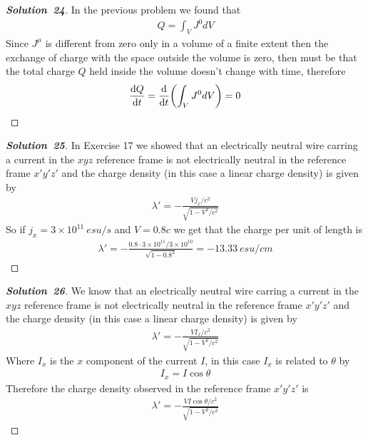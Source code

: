 \documentclass[11pt]{article}
\newcommand{\sci}[1]{\times 10^{#1}}
\theoremstyle{definition}
\renewcommand*{\proofname}{\bf{Solution}}
\begin{document}
\cleardoublepage
\begin{proof}[\proofname\ 24]
In the previous problem we found that
\begin{align*}
    Q = \int_V J^0 dV
\end{align*}
Since $J^\mu$ is different from zero only in a volume of a finite extent then
the exchange of charge with the space outside the volume is zero, then must be
that the total charge $Q$ held inside the volume doesn't change with time, 
therefore
\begin{align*}
    \dv{Q}{t} = \dv{t}(\int_V J^0 dV) = 0
\end{align*}
\end{proof}

\cleardoublepage
\begin{proof}[\proofname\ 25]
In Exercise 17 we showed that an electrically neutral wire carring a current
in the $xyz$ reference frame is not electrically neutral in the reference 
frame $x'y'z'$ and the charge density (in this case a linear charge density)
is given by
\begin{align*}
    \lambda' = -\frac{Vj_x/c^2}{\sqrt{1 - V^2/c^2}}
\end{align*}
So if $j_x = 3\sci{11}~esu/s$ and $V = 0.8c$ we get that the charge per unit of
length is
\begin{align*}
    \lambda' = -\frac{0.8 \cdot 3\sci{11}/3\sci{10}}{\sqrt{1 - 0.8^2}}
    = -13.33~esu/cm
\end{align*}
\end{proof}

\cleardoublepage
\begin{proof}[\proofname\ 26]
We know that an electrically neutral wire carring a current
in the $xyz$ reference frame is not electrically neutral in the reference 
frame $x'y'z'$ and the charge density (in this case a linear charge density)
is given by
\begin{align*}
    \lambda' = -\frac{VI_x/c^2}{\sqrt{1 - V^2/c^2}}
\end{align*}
Where $I_x$ is the $x$ component of the current $I$, in this case $I_x$ is
related to $\theta$ by
\begin{align*}
    I_x = I\cos\theta
\end{align*}
Therefore the charge density observed in the reference frame $x'y'z'$ is
\begin{align*}
    \lambda' = -\frac{VI\cos\theta/c^2}{\sqrt{1 - V^2/c^2}}
\end{align*}
\end{proof}
\end{document}
